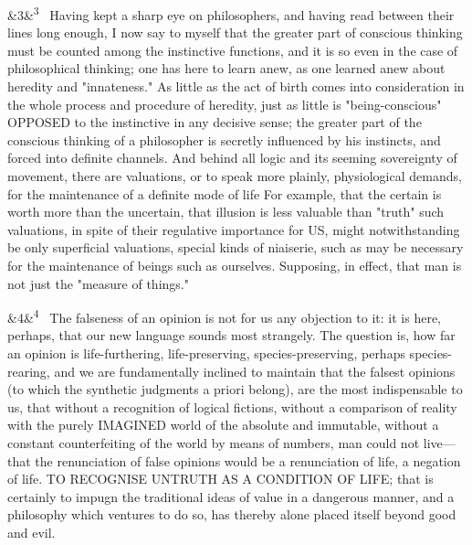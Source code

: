 \documentclass[12pt]{article}
\newcommand{\para}[1][]{\par\noindent\ifx&#1&\else\textsuperscript{\footnotesize #1}~\fi}
\begin{document}
\para[3] Having kept a sharp eye on philosophers, and having read between their lines long enough, I now say to myself that the greater part of conscious thinking must be counted among the instinctive functions, and it is so even in the case of philosophical thinking; one has here to learn anew, as one learned anew about heredity and "innateness." As little as the act of birth comes into consideration in the whole process and procedure of heredity, just as little is "being-conscious" OPPOSED to the instinctive in any decisive sense; the greater part of the conscious thinking of a philosopher is secretly influenced by his instincts, and forced into definite channels. And behind all logic and its seeming sovereignty of movement, there are valuations, or to speak more plainly, physiological demands, for the maintenance of a definite mode of life For example, that the certain is worth more than the uncertain, that illusion is less valuable than "truth" such valuations, in spite of their regulative importance for US, might notwithstanding be only superficial valuations, special kinds of niaiserie, such as may be necessary for the maintenance of beings such as ourselves. Supposing, in effect, that man is not just the "measure of things."

\para[4] The falseness of an opinion is not for us any objection to it: it is here, perhaps, that our new language sounds most strangely. The question is, how far an opinion is life-furthering, life-preserving, species-preserving, perhaps species-rearing, and we are fundamentally inclined to maintain that the falsest opinions (to which the synthetic judgments a priori belong), are the most indispensable to us, that without a recognition of logical fictions, without a comparison of reality with the purely IMAGINED world of the absolute and immutable, without a constant counterfeiting of the world by means of numbers, man could not live---that the renunciation of false opinions would be a renunciation of life, a negation of life. TO RECOGNISE UNTRUTH AS A CONDITION OF LIFE; that is certainly to impugn the traditional ideas of value in a dangerous manner, and a philosophy which ventures to do so, has thereby alone placed itself beyond good and evil.
\end{document}
